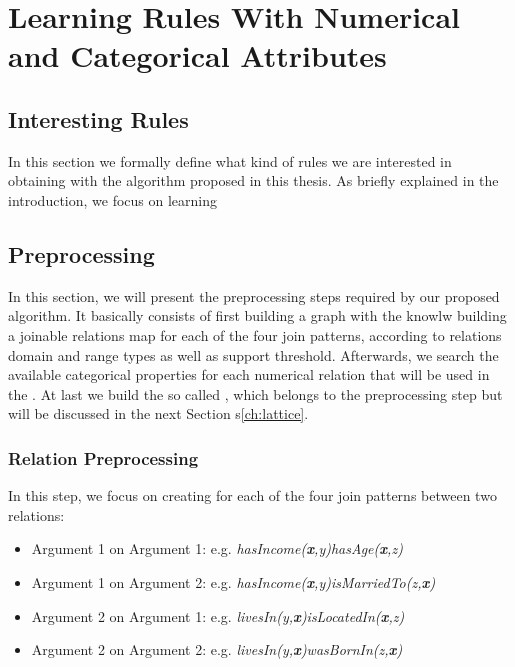 \chapter{Learning Rules With Numerical and Categorical Attributes}
\label{cl:intro}

\section{Interesting Rules}

In this section we formally define what kind of rules we are interested in obtaining with the algorithm proposed in
this thesis. As briefly explained in the introduction, we focus on learning 

\section{Preprocessing}

In this section, we will present the preprocessing steps required by our proposed algorithm. It basically consists of
first building a graph with the knowlw building a joinable relations map for each of the four join patterns, according
to relations domain and range types as well as support threshold. Afterwards, we search the available categorical
properties for each numerical relation that will be used in the \graphname. At last we build the so called \graphname,
which belongs to the preprocessing step but will be discussed in the next Section s\ref{ch:lattice}.

\subsection{Relation Preprocessing}

In this step, we focus on creating for each of the four join patterns between two relations:

\begin{itemize}
 \item Argument 1 on Argument 1: e.g. \emph{hasIncome(\textbf{x},y)hasAge(\textbf{x},z)}
 \item Argument 1 on Argument 2: e.g. \emph{hasIncome(\textbf{x},y)isMarriedTo(z,\textbf{x})}
 \item Argument 2 on Argument 1: e.g. \emph{livesIn(y,\textbf{x})isLocatedIn(\textbf{x},z)}
 \item Argument 2 on Argument 2: e.g. \emph{livesIn(y,\textbf{x})wasBornIn(z,\textbf{x})}
\end{itemize}

